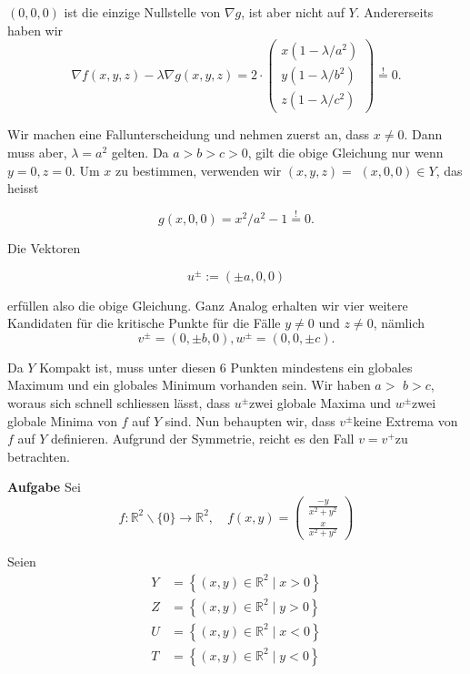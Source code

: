 $(0,0,0)$ ist die einzige Nullstelle von $\nabla g$, ist aber nicht auf $Y$. Andererseits haben wir
$$
\nabla f(x, y, z)-\lambda \nabla g(x, y, z)=2 \cdot\left(\begin{array}{c}
x(1-\lambda / a^2) \\
y(1-\lambda / b^2) \\
z(1-\lambda / c^2)
\end{array}\right) \stackrel{!}{=} 0 .
$$

Wir machen eine Fallunterscheidung und nehmen zuerst an, dass $x \neq 0$. Dann muss aber, $\lambda=a^2$ gelten. Da $a>b>c>0$, gilt die obige Gleichung nur wenn $y=0, z=0$. Um $x$ zu bestimmen, verwenden wir $(x, y, z)=$ $(x, 0,0) \in Y$, das heisst

$$
g(x, 0,0)=x^{2} / a^{2}-1 \stackrel{!}{=} 0 .
$$

Die Vektoren

$$
u^{\pm}:=(\pm a, 0,0)
$$

erfüllen also die obige Gleichung. Ganz Analog erhalten wir vier weitere Kandidaten für die kritische Punkte für die Fälle $y \neq 0$ und $z \neq 0$, nämlich
$$
v^{\pm}=(0, \pm b, 0), w^{\pm}=(0,0, \pm c) .
$$

Da $Y$ Kompakt ist, muss unter diesen 6 Punkten mindestens ein globales Maximum und ein globales Minimum vorhanden sein. Wir haben 
$a>$ $b>c$, woraus sich schnell schliessen lässt, dass $u^{\pm}$zwei globale Maxima und $w^{\pm}$zwei globale Minima von $f$ auf $Y$ sind. 
Nun behaupten wir, dass $v^{\pm}$keine Extrema von $f$ auf $Y$ definieren. Aufgrund der Symmetrie, reicht es den Fall $v=v^{+}$zu betrachten. 

\hrulefill

\textbf{Aufgabe} Sei
$$
f: \mathbb{R}^{2} \backslash\{0\} \rightarrow \mathbb{R}^{2}, \quad f(x, y)=\left(\begin{array}{c}
\frac{-y}{x^{2}+y^{2}} \\
\frac{x}{x^{2}+y^{2}}
\end{array}\right)
$$

Seien
$$
\begin{aligned}
Y &=\left\{(x, y) \in \mathbb{R}^{2} \mid x>0\right\} \\
Z &=\left\{(x, y) \in \mathbb{R}^{2} \mid y>0\right\} \\
U &=\left\{(x, y) \in \mathbb{R}^{2} \mid x<0\right\} \\
T &=\left\{(x, y) \in \mathbb{R}^{2} \mid y<0\right\}
\end{aligned}
$$

